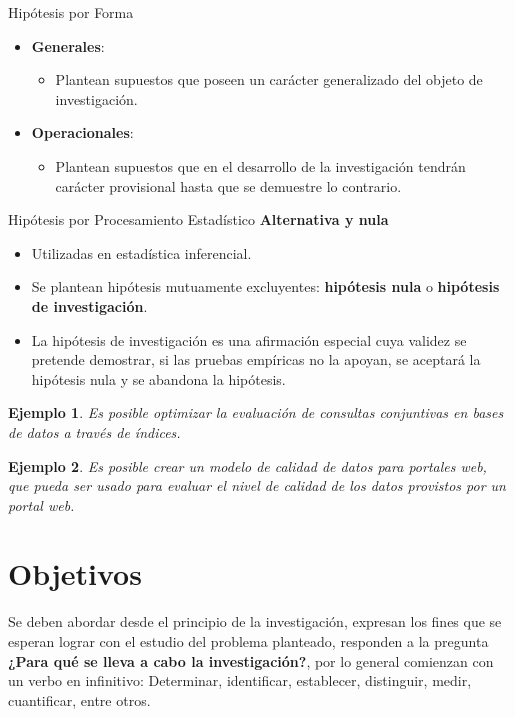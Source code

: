 \documentclass[letter,12pt]{report}
\newcommand\naranjo[1]{\textcolor[rgb]{1.00,0.36,0.06}{\textbf{#1}}}
\newtheorem{ejemplo}{Ejemplo}
\begin{document}
Hipótesis por Forma
\begin{itemize}
  \item \textbf{Generales}:
  \begin{itemize}
  \item Plantean supuestos que poseen un carácter generalizado del objeto de investigación.
\end{itemize}

  \item \textbf{Operacionales}:
  \begin{itemize}
  \item Plantean supuestos que en el desarrollo de la investigación tendrán carácter provisional hasta que se demuestre lo contrario.
\end{itemize}

\end{itemize}

Hipótesis por Procesamiento Estadístico
\textbf{Alternativa y nula}
 \begin{itemize}\justifying
  \item Utilizadas en estadística inferencial.
  \item Se plantean hipótesis mutuamente excluyentes: \naranjo{hipótesis nula} o \naranjo{hipótesis de investigación}.
  \item La hipótesis de investigación es una afirmación especial cuya validez se pretende demostrar, si las pruebas empíricas no la apoyan, se aceptará la hipótesis nula y se abandona la hipótesis.
\end{itemize}

\begin{ejemplo}
  Es posible optimizar la evaluación de consultas conjuntivas en bases de datos a través de índices.
\end{ejemplo}

\begin{ejemplo}
  Es posible crear un modelo de calidad de datos para portales web, que pueda ser usado para evaluar el nivel de calidad de los datos provistos por un portal web.
\end{ejemplo}

\section{Objetivos}\label{objetivos}

Se deben abordar desde el principio de la investigación, expresan los fines que se esperan lograr con el estudio del problema planteado, responden a la pregunta \naranjo{¿Para qué se lleva a cabo la investigación?}, por lo general comienzan con un verbo en infinitivo: Determinar, identificar, establecer, distinguir, medir, cuantificar, entre otros.
\end{document}
